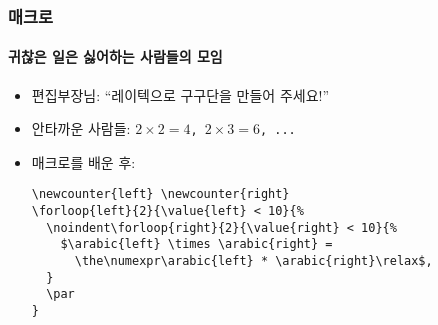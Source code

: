 
\begin{frame}[fragile]
  \frametitle{매크로}
  \framesubtitle{귀찮은 일은 싫어하는 사람들의 모임}
  \begin{itemize}
    \item<1-> 편집부장님: ``레이텍으로 구구단을 만들어 주세요!''
    \item<1-> 안타까운 사람들: \texttt{$2 \times 2 = 4$, $2 \times 3 = 6$, ...}
    \item<2-> 매크로를 배운 후:\vspace{-1em}
    \begin{verbatim}
\newcounter{left} \newcounter{right}
\forloop{left}{2}{\value{left} < 10}{%
  \noindent\forloop{right}{2}{\value{right} < 10}{%
    $\arabic{left} \times \arabic{right} =
      \the\numexpr\arabic{left} * \arabic{right}\relax$,
  }
  \par
}
    \end{verbatim}
  \end{itemize}
\end{frame}

